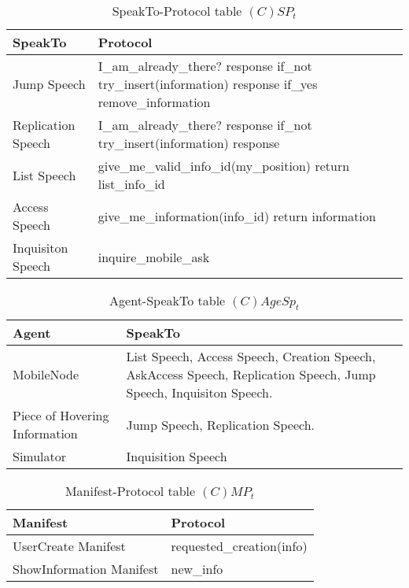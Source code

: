 \begin{table}[H]
	\centering
	\begin{tabular}{|p{4cm}|p{8cm}|}
			\hline
			\textbf{SpeakTo} & \textbf{Protocol} \\
			\hline
			Jump Speech & I\_am\_already\_there? \newline response \newline if\_not
			try\_insert(information) \newline response \newline if\_yes remove\_information \\
			\hline
			Replication Speech & I\_am\_already\_there? \newline response \newline if\_not
			try\_insert(information) \newline response \\
			\hline
			List Speech & give\_me\_valid\_info\_id(my\_position) \newline return list\_info\_id\\
			\hline
			Access Speech & give\_me\_information(info\_id) \newline return information \\
			\hline
			Inquisiton Speech & inquire\_mobile\_ask \\
			\hline
		\end{tabular}
	\caption{SpeakTo-Protocol table $(C)SP_t$}
	\label{tab:cspt}
\end{table}

\begin{table}[H]
	\centering
	\begin{tabular}{|p{4cm}|p{8cm}|}
			\hline
			\textbf{Agent} & \textbf{SpeakTo} \\
			\hline
      MobileNode & List Speech, Access Speech, Creation Speech, AskAccess
      Speech, Replication Speech, Jump Speech, Inquisiton Speech. \\
			\hline
			Piece of Hovering Information & Jump Speech, Replication Speech. \\
			\hline
			Simulator & Inquisition Speech \\
			\hline
		\end{tabular}
	\caption{Agent-SpeakTo table $(C)AgeSp_t$}
	\label{tab:cagespt}
\end{table}

\begin{table}[H]
	\centering
	\begin{tabular}{|p{4cm}|p{8cm}|}
			\hline
			\textbf{Manifest} & \textbf{Protocol} \\
			\hline
			UserCreate Manifest & requested\_creation(info) \\
			\hline
			ShowInformation Manifest & new\_info \\
			\hline
		\end{tabular}
	\caption{Manifest-Protocol table $(C)MP_t$}
	\label{tab:cmpt}
\end{table}

